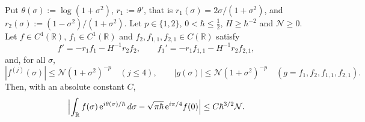 \begin{lemma}\label{cl:sp}
Put $\theta(\sigma):=\log(1+\sigma^2)$, $r_1:=\theta'$, that is $r_1(\sigma)=2\sigma/(1+\sigma^2)$, and $r_2(\sigma):=(1-\sigma^2)/(1+\sigma^2)$.
Let $p\in\{1,2\}$, $0<\hbar\le\tfrac12$, $H\ge\hbar^{-2}$ and $\mathcal N\ge0$. Let $f\in C^4(\mathbb R)$, $f_1\in C^1(\mathbb R)$ and
$f_2,f_{1,1},f_{2,1}\in C(\mathbb R)$ satisfy
\begin{equation}\label{cl:fprime}
f'=-r_1f_1-H^{-1}r_2f_2,\qquad f_1'=-r_1f_{1,1}-H^{-1}r_2f_{2,1},
\end{equation}
and, for all $\sigma$,
\begin{equation}\label{cl:fbd}
|f^{(j)}(\sigma)|\le\mathcal N(1+\sigma^2)^{-p}\quad(j\le4),\qquad|g(\sigma)|\le\mathcal N(1+\sigma^2)^{-p}\quad(g=f_1,f_2,f_{1,1},f_{2,1}).
\end{equation}
Then, with an absolute constant $C$,
\[
\Bigl|\int_{\mathbb R}f(\sigma)\,\mathrm{e}^{i\theta(\sigma)/\hbar}\,d\sigma-\sqrt{\pi\hbar}\,\mathrm{e}^{i\pi/4}f(0)\Bigr|\le C\hbar^{3/2}\mathcal N .
\]
\end{lemma}
